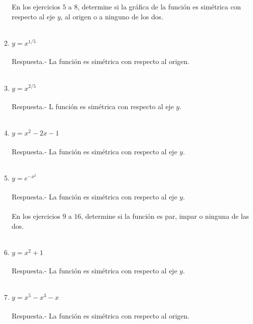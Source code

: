 \begin{enumerate}[\bfseries 1.]
En los ejercicios $5$ a $8$, determine si la gráfica de la función es simétrica con respecto al eje $y$, al origen o a ninguno de los dos.\\\\

\item $y=x^{1/5}$\\\\
    Respuesta.-\; La función es simétrica con respecto al origen.\\\\

\item $y=x^{2/5}$\\\\
    Respuesta.-\; L función es simétrica con respecto al eje $y$.\\\\

\item $y=x^2-2x-1$\\\\
    Respuesta.-\; La función es simétrica con respecto al eje $y$.\\\\

\item $y=e^{-x^2}$\\\\
    Respuesta.-\; La función es simétrica con respecto al eje $y$.\\\\

En los ejercicios $9$ a $16$, determine si la función es par, impar o ninguna de las dos.\\\\

\item $y=x^2 + 1$\\\\
    Respuesta.-\; La función es simétrica con respecto al eje $y$.\\\\

\item $y=x^5 - x^3 - x$\\\\
    Respuesta.-\; La función es simétrica con respecto al origen.\\\\


\end{enumerate}

